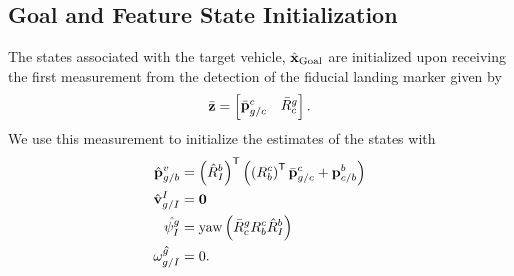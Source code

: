 
\subsection{Goal and Feature State Initialization}

The states associated with the target vehicle, $\hat{\boldsymbol{\mathrm{x}}}_{\text{Goal}}$ are
initialized upon receiving the first measurement from
the detection of the fiducial landing marker given by
\begin{equation}
  \bar{\boldsymbol{\mathrm{z}}} =
  \begin{bmatrix}
    \bar{\boldsymbol{\mathrm{p}}}_{g/c}^c & \bar{R}_c^g
  \end{bmatrix}.
  \label{eq:fiducial_meas}
\end{equation}
We use this measurement to initialize the estimates of the states with
\begin{align}
  \hat{\boldsymbol{\mathrm{p}}}_{g/b}^v &= \left( \hat{R}_I^b \right)^{\mathsf{T}} \left( \left ( R_b^c
  \right)^{\mathsf{T}} \bar{\boldsymbol{\mathrm{p}}}_{g/c}^c + \boldsymbol{\mathrm{p}}_{c/b}^b
\right)   \\
      \hat{\boldsymbol{\mathrm{v}}}_{g/I}^I &= \boldsymbol{\mathrm{0}} \\
      \hat{\psi_I^g} &= \text{yaw} \left( \bar{R}_c^g R_b^c \hat{R}_I^b \right)
      \\
      \hat{\omega_{g/I}^g} &= 0.
\end{align}


